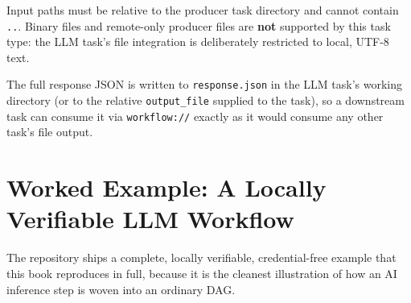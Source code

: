 \begin{cautionbox}
Input paths must be relative to the producer task directory and cannot
contain \texttt{..}. Binary files and remote-only producer files are
\textbf{not} supported by this task type: the LLM task's file integration is
deliberately restricted to local, UTF-8 text.
\end{cautionbox}

The full response JSON is written to \texttt{response.json} in the LLM
task's working directory (or to the relative \texttt{output\_file} supplied
to the task), so a downstream task can consume it via \texttt{workflow://}
exactly as it would consume any other task's file output.

\section{Worked Example: A Locally Verifiable LLM Workflow}

The repository ships a complete, locally verifiable, credential-free example
that this book reproduces in full, because it is the cleanest illustration
of how an AI inference step is woven into an ordinary DAG.

